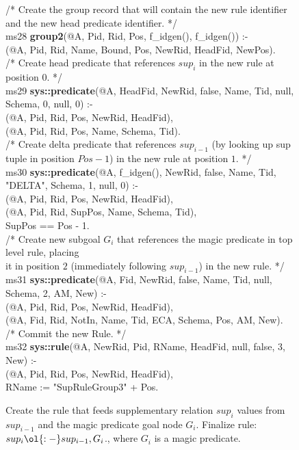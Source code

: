 \begin{figure}[!t]
\ssp
\centering
\begin{boxedminipage}{\linewidth}
/* Create the group record that will contain the new rule identifier \\
and the new head predicate identifier. */ \\
ms28 {\bf group2}(@A, Pid, Rid, Pos, f\_idgen(), f\_idgen()) :- \\
(@A, Pid, Rid, Name, Bound, Pos, NewRid, HeadFid, NewPos). \\
	
/* Create head predicate that references $sup_i$ in the new rule at position $0$. */ \\
ms29 {\bf sys::predicate}(@A, HeadFid, NewRid, false, Name, Tid, null, Schema, 0, null, 0) :- \\
(@A, Pid, Rid, Pos, NewRid, HeadFid), \\
(@A, Pid, Rid, Pos, Name, Schema, Tid). \\
	
/* Create delta predicate that references  $sup_{i-1}$ (by looking up sup  \\
tuple in position $Pos - 1$) in the new rule at position $1$. */ \\
ms30 {\bf sys::predicate}(@A, f\_idgen(), NewRid, false, Name, Tid, "DELTA", Schema, 1, null, 0) :- \\
(@A, Pid, Rid, Pos, NewRid, HeadFid), \\
(@A, Pid, Rid, SupPos, Name, Schema, Tid), \\
\datalogspace SupPos == Pos - 1. \\
	
/* Create new subgoal $G_i$ that references the magic predicate in top level rule, placing \\
it in position $2$ (immediately following $sup_{i-1}$) in the new rule. */ \\
ms31 {\bf sys::predicate}(@A, Fid, NewRid, false, Name, Tid, null, Schema, 2, AM, New) :- \\
(@A, Pid, Rid, Pos, NewRid, HeadFid), \\
(@A, Fid, Rid, NotIn, Name, Tid, ECA, Schema, Pos, AM, New). \\
	
/* Commit the new Rule. */ \\
ms32 {\bf sys::rule}(@A, NewRid, Pid, RName, HeadFid, null, false, 3, New) :- \\
(@A, Pid, Rid, Pos, NewRid, HeadFid), \\
\datalogspace RName := "SupRuleGroup3" + Pos. \\

\end{boxedminipage}
\caption{\label{ch:evita:fig:mpgoal} Create the rule that feeds supplementary
relation $sup_i$ values from $sup_{i-1}$ and the magic predicate goal node $G_i$.
Finalize rule: $sup_i \ol{:-} sup_{i-1}, G_i$., where $G_i$ is a magic predicate. }
\end{figure}

